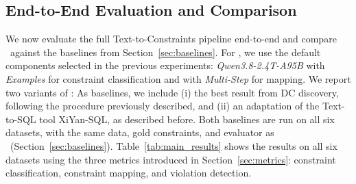 \subsection{End-to-End Evaluation and Comparison}
\label{sec:endtoend}

We now evaluate the full Text-to-Constraints pipeline end-to-end and compare \system\ against the baselines from Section~\ref{sec:baselines}. For \system, we use the default components selected in the previous experiments: \emph{Qwen3.8-2.4T-A95B} with \emph{Examples} for constraint classification and  with \emph{Multi-Step} for mapping.
We report two variants of \system: 
As baselines, we include (i) the best result from DC discovery, following the procedure previously described, and (ii) an adaptation of the Text-to-SQL tool XiYan-SQL, as described before. Both baselines are run on all six datasets, with the same data, gold constraints, and evaluator as \system\ (Section~\ref{sec:baselines}).
Table~\ref{tab:main_results} shows the results on all six datasets using the three metrics introduced in Section~\ref{sec:metrics}: constraint classification, constraint mapping, and violation detection.

\begin{table}[!ht]
  \centering
  \caption{End-to-end comparison of \system\ modes, Classifier+Multi-Step (C+MS) and Multi-Step, and the baselines across six
datasets. \textbf{Profiling} denotes DC discovery from data alone, and
\textbf{Text2SQL} denotes XiYan-SQL adapted to generate violation queries from
regulatory sentences; DNF marks configurations that did not finish within the time and memory limits. n/a indicates that the metric is not applicable; bold
marks the best F$_1$ for each metric and dataset.}
  \label{tab:main_results}
  \small
  \setlength{\tabcolsep}{4pt}
  \resizebox{\columnwidth}{!}{%
  
  }%
\end{table}

